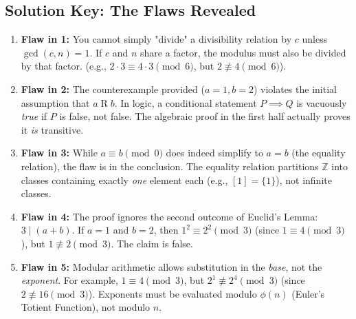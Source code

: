 \documentclass[11pt, a4paper]{article}
\theoremstyle{definition}
\theoremstyle{remark}
\begin{document}
\subsection*{Solution Key: The Flaws Revealed}
\begin{enumerate}
    \item \textbf{Flaw in 1:} You cannot simply "divide" a divisibility relation by $c$ unless $\gcd(c, n) = 1$. If $c$ and $n$ share a factor, the modulus must also be divided by that factor. (e.g., $2 \cdot 3 \equiv 4 \cdot 3 \pmod{6}$, but $2 \not\equiv 4 \pmod{6}$).
    \item \textbf{Flaw in 2:} The counterexample provided ($a=1, b=2$) violates the initial assumption that $a \mathrel{R} b$. In logic, a conditional statement $P \implies Q$ is vacuously \textit{true} if $P$ is false, not false. The algebraic proof in the first half actually proves it \textit{is} transitive.
    \item \textbf{Flaw in 3:} While $a \equiv b \pmod{0}$ does indeed simplify to $a = b$ (the equality relation), the flaw is in the conclusion. The equality relation partitions $\mathbb{Z}$ into classes containing exactly \textit{one} element each (e.g., $[1] = \{1\}$), not infinite classes.
    \item \textbf{Flaw in 4:} The proof ignores the second outcome of Euclid's Lemma: $3 \mid (a + b)$. If $a = 1$ and $b = 2$, then $1^2 \equiv 2^2 \pmod{3}$ (since $1 \equiv 4 \pmod{3}$), but $1 \not\equiv 2 \pmod{3}$. The claim is false.
    \item \textbf{Flaw in 5:} Modular arithmetic allows substitution in the \textit{base}, not the \textit{exponent}. For example, $1 \equiv 4 \pmod{3}$, but $2^1 \not\equiv 2^4 \pmod{3}$ (since $2 \not\equiv 16 \pmod{3}$). Exponents must be evaluated modulo $\phi(n)$ (Euler's Totient Function), not modulo $n$.
\end{enumerate}
\end{document}
